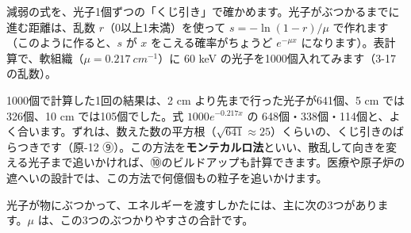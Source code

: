 \begin{phmodel}[狭いビームの減弱]
\end{phmodel}

減弱の式を、光子1個ずつの「くじ引き」で確かめます。光子がぶつかるまでに進む距離は、乱数 $r$（0以上1未満）を使って $s=-\ln(1-r)/\mu$ で作れます（このように作ると、$s$ が $x$ をこえる確率がちょうど $e^{-\mu x}$ になります）。表計算で、軟組織（$\mu=\qty{0.217}{cm^{-1}}$）に 60 keV の光子を1000個入れてみます（3-17 の乱数）。
\begin{bkcenter}
\label{ph:原-13:tab-mc}
\end{bkcenter}
1000個で計算した1回の結果は、2 cm より先まで行った光子が641個、5 cm では326個、10 cm では105個でした。式 $1000e^{-0.217x}$ の 648個・338個・114個と、よく合います。ずれは、数えた数の平方根（$\sqrt{641}\approx25$）くらいの、くじ引きのばらつきです（原-12 ⑨）。この方法を\textbf{モンテカルロ法}といい、散乱して向きを変える光子まで追いかければ、⑩のビルドアップも計算できます。医療や原子炉の遮へいの設計では、この方法で何億個もの粒子を追いかけます。

\label{ph:原-13:sec4}
光子が物にぶつかって、エネルギーを渡すしかたには、主に次の3つがあります。$\mu$ は、この3つのぶつかりやすさの合計です。

